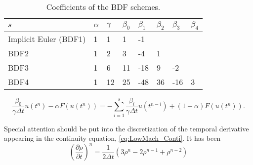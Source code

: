 \begin{table}[t]
	\centering
	\begin{tabular}{llllllll}
		\hline
		$s$                   & $\alpha$      & $\gamma$ & $\beta_0$ & $\beta_1$ & $\beta_2$ & $\beta_3$ & $\beta_4$ \\ \hline
		Implicit Euler (BDF1) & 1             & 1        & 1         & -1        &           &           &           \\
		BDF2                  & 1             & 2        & 3         & -4        & 1         &           &           \\
		BDF3                  & 1             & 6        & 11        & -18       & 9         & -2        &           \\
		BDF4                  & 1             & 12       & 25        & -48       & 36        & -16       & 3         \\\hline
	\end{tabular}
	\caption{Coefficients of the BDF schemes.}
	\label{tab:BDFCoeff}
\end{table}
\begin{equation}
	\frac{\beta_0}{\gamma\Delta t}u(t^n)-\alpha F(u(t^n)) = - \sum_{i=1}^s \frac{\beta_i}{\gamma \Delta t}u(t^{n-i})+(1-\alpha)F(u(t^n)).
\end{equation}

\textcite{nicoudConservativeHighOrderFiniteDifference2000}
Special attention should be put into the discretization of the temporal derivative appearing in the continuity equation, \cref{eq:LowMach_Conti}. It has been 
\begin{equation}
	\left(\frac{\partial \rho}{\partial t} \right)^n= \frac{1}{2\Delta t}\left(3\rho^n-2\rho^{n-1}+\rho^{n-2}\right)
\end{equation}


